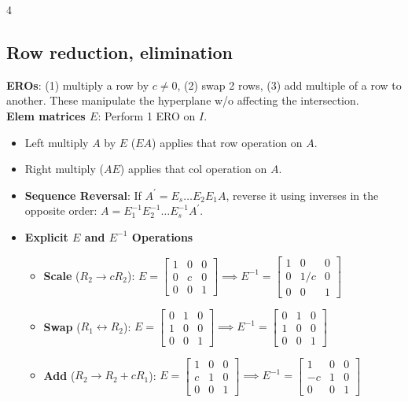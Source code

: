 \documentclass[9pt]{extarticle}
\begin{document}
\begin{multicols*}{4}
\subsection*{Row reduction, elimination}
\textbf{EROs}: (1) multiply a row by $c \neq 0$, (2) swap 2 rows, (3) add multiple of a row to another. These manipulate the hyperplane w/o affecting the intersection.\\
\textbf{Elem matrices $E$}: Perform 1 ERO on $I$.
\begin{itemize}
    \item Left multiply $A$ by $E$ ($EA$) applies that row operation on $A$.
    \item Right multiply ($AE$) applies that col operation on $A$.
    \item \textbf{Sequence Reversal}: If $A^{\prime} = E_s \dots E_2 E_1 A$, reverse it using inverses in the opposite order: $A = E_1^{-1} E_2^{-1} \dots E_s^{-1} A^{\prime}$.
\end{itemize}
\begin{itemize}
    \item \textbf{Explicit $E$ and $E^{-1}$ Operations} 
    \begin{itemize}
        \item \textbf{Scale} ($R_2 \to cR_2$): $E=\begin{bmatrix} 1 & 0 & 0 \\ 0 & c & 0 \\ 0 & 0 & 1 \end{bmatrix} \implies E^{-1}=\begin{bmatrix} 1 & 0 & 0 \\ 0 & 1/c & 0 \\ 0 & 0 & 1 \end{bmatrix}$
        \item \textbf{Swap} ($R_1 \leftrightarrow R_2$): $E=\begin{bmatrix} 0 & 1 & 0 \\ 1 & 0 & 0 \\ 0 & 0 & 1 \end{bmatrix} \implies E^{-1}=\begin{bmatrix} 0 & 1 & 0 \\ 1 & 0 & 0 \\ 0 & 0 & 1 \end{bmatrix}$
        \item \textbf{Add} ($R_2 \to R_2 + cR_1$): $E=\begin{bmatrix} 1 & 0 & 0 \\ c & 1 & 0 \\ 0 & 0 & 1 \end{bmatrix} \implies E^{-1}=\begin{bmatrix} 1 & 0 & 0 \\ -c & 1 & 0 \\ 0 & 0 & 1 \end{bmatrix}$

\end{itemize}
\end{itemize}
\end{multicols*}
\end{document}
